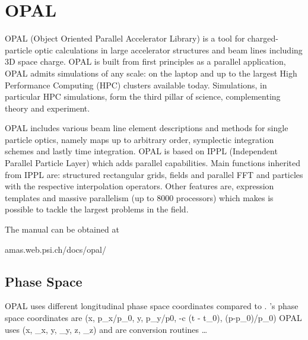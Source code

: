 \chapter{OPAL}
\label{c:opal}

OPAL (Object Oriented Parallel Accelerator Library) is a tool for charged-particle optic
calculations in large accelerator structures and beam lines including 3D space charge. OPAL is built
from first principles as a parallel application, OPAL admits simulations of any scale: on the laptop
and up to the largest High Performance Computing (HPC) clusters available today. Simulations, in
particular HPC simulations, form the third pillar of science, complementing theory and experiment.

OPAL includes various beam line element descriptions and methods for single particle optics, namely
maps up to arbitrary order, symplectic integration schemes and lastly time integration. OPAL is
based on IPPL (Independent Parallel Particle Layer) which adds parallel capabilities. Main functions
inherited from IPPL are: structured rectangular grids, fields and parallel FFT and particles with
the respective interpolation operators. Other features are, expression templates and massive
parallelism (up to 8000 processors) which makes is possible to tackle the largest problems in the
field.

The  manual can be obtained at
\begin{example} 
  amas.web.psi.ch/docs/opal/   
\end{example}


\section{Phase Space}
\label{s:opal.space}

OPAL uses different longitudinal phase space coordinates compared to \bmad.
\bmad's phase space coordinates are
\Begineq
  (x, p_x/p_0, y, p_y/p0, -\beta c (t - t_0), (p-p_0)/p_0)
\Endeq
OPAL uses
\Begineq
  (x, \gamma \beta_x,  y, \gamma \beta_y, z, \gamma \beta_z)
\Endeq
{} and  are conversion routines \ldots

